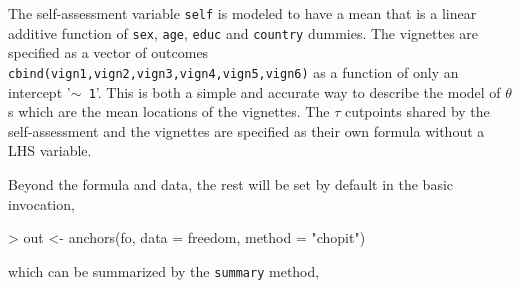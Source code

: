 \documentclass{amsart}
\newcommand{\code}[1]{{\texttt{#1}}}
\begin{document}
The self-assessment variable \code{self} is modeled to have a mean
that is a linear additive function of \code{sex}, \code{age},
\code{educ} and \code{country} dummies.  The vignettes are specified
as a vector of outcomes
\code{cbind(vign1,vign2,vign3,vign4,vign5,vign6)} as a function of
only an intercept '\code{$\sim$ 1}'.  This is both a simple and
accurate way to describe the model of $\theta$s which are the mean
locations of the vignettes.  The $\tau$ cutpoints shared by the
self-assessment and the vignettes are specified as their own formula
without a LHS variable.

Beyond the formula and data, the rest will be set by default in the
basic invocation,
\begin{Schunk}
\begin{Sinput}
> out <- anchors(fo, data = freedom, method = "chopit")
\end{Sinput}
\end{Schunk}
which can be summarized by the \code{summary} method,
\end{document}
